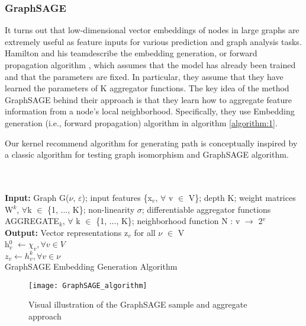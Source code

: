 \subsubsection{GraphSAGE}
It turns out that low-dimensional vector embeddings of nodes in large graphs are extremely useful as feature inputs for various prediction and graph analysis tasks. Hamilton and his team\cite{hamilton2017inductive}describe the embedding generation, or forward propagation algorithm , which assumes that the model has already been trained and that the parameters are fixed. In particular, they assume that they have learned the parameters of K aggregator functions. The key idea of the method GraphSAGE behind their approach is that they learn how to aggregate feature information from a node's local neighborhood. Specifically, they use Embedding generation (i.e., forward propagation) algorithm in algorithm \ref{algorithm:1}.
\par Our kernel recommend algorithm for generating path is conceptually inspired by a classic algorithm for testing graph isomorphism and GraphSAGE algorithm.
\\
\\
\\
\begin{algorithm}[H]
\SetAlgoLined
\textbf{Input:} Graph G($\nu$, $\varepsilon $); input features \{x$_{v}$, $ \forall $ v $ \in $ V\}; depth K; weight matrices W$ ^{k} $, $ \forall $k $ \in $ \{1, ..., K\}; non-linearity $ \sigma $; differentiable aggregator functions AGGREGATE$_{k}$, $ \forall $ k $ \in $ \{1, ..., K\}; neighborhood function N : v  $ \rightarrow $ 2$ ^{v} $  \\

\textbf{Output:} Vector representations z$_{v}$ for all $\nu$ $ \in $ V \\
h$_{v}^{0}$ $ \leftarrow \chi _{v},\forall v\in V $ \\
 $ z_{v} \leftarrow h_{v}^{k}, \forall v \in \nu $ \\
 \caption{GraphSAGE Embedding Generation Algorithm}
 \label{algorithm:1}
\end{algorithm}

\begin{figure}[h]
\caption{Visual illustration of the GraphSAGE sample and aggregate approach}
\label{figure:2-3}
\centering
\texttt{[image: GraphSAGE\_algorithm]}
\end{figure}

\cleardoublepage